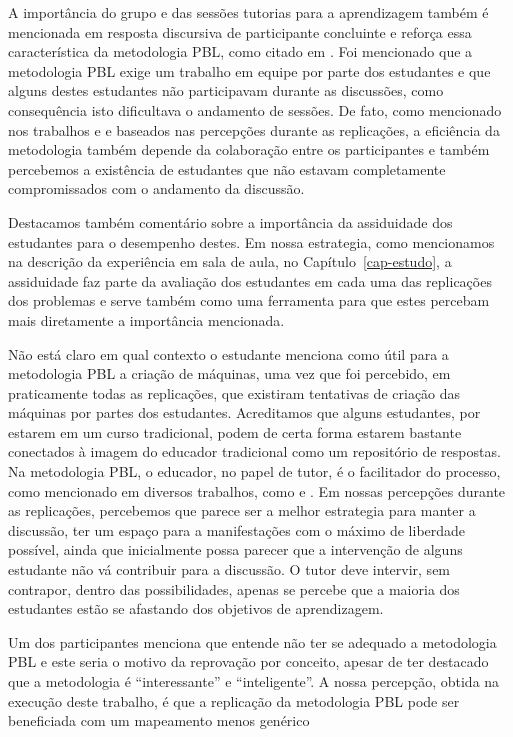 A importância do grupo e das sessões tutorias para a aprendizagem
também é mencionada em resposta discursiva de participante concluinte
e reforça essa característica da metodologia \ac{PBL}, como citado
em \cite{van2000motivation}.
Foi mencionado que a metodologia \ac{PBL} exige um trabalho em equipe por
parte dos estudantes e que alguns destes estudantes não participavam
durante as discussões, como consequência isto dificultava o
andamento de sessões.
De fato, como mencionado nos
trabalhos \cite{savery2015overview} e \cite{albanese2010problem}
e baseados nas percepções durante as replicações, a eficiência da metodologia
também depende da colaboração entre os participantes e
também percebemos a existência de estudantes que não estavam
completamente compromissados com o andamento da discussão.

Destacamos também comentário sobre a importância da assiduidade dos
estudantes para o desempenho destes.
Em nossa estrategia, como mencionamos na descrição da experiência
em sala de aula, no Capítulo~\ref{cap-estudo}, a assiduidade faz
parte da avaliação dos estudantes em cada uma das replicações dos
problemas e serve também como uma ferramenta para que estes
percebam mais diretamente a importância mencionada.

Não está claro em qual contexto o estudante menciona como útil
para a metodologia \ac{PBL} a criação de máquinas, uma vez que
foi percebido, em praticamente todas as replicações, que
existiram tentativas de criação das máquinas por partes
dos estudantes.
Acreditamos que alguns estudantes, por estarem em um curso
tradicional, podem de certa forma estarem bastante conectados
à imagem do educador tradicional como um repositório de
respostas.
Na metodologia \ac{PBL}, o educador, no papel de tutor, é o facilitador
do processo, como mencionado em diversos trabalhos, como
\cite{hmelo2004problem} e \cite{savery2015overview}.
Em nossas percepções durante as replicações, percebemos que
parece ser a melhor estrategia para manter a discussão, ter um
espaço para a manifestações com o máximo de liberdade possível,
ainda que inicialmente possa parecer que a intervenção
de alguns estudante não vá contribuir para
a discussão.
O tutor deve intervir, sem contrapor, dentro das possibilidades,
apenas se percebe que a maioria dos estudantes estão se afastando
dos objetivos de aprendizagem.

Um dos participantes menciona que entende não ter se adequado
a metodologia \ac{PBL} e este seria o motivo da reprovação por conceito,
apesar de ter destacado que a metodologia é ``interessante'' e ``inteligente''.
A nossa percepção, obtida na execução deste trabalho, é que a replicação
da metodologia \ac{PBL} pode ser beneficiada com um mapeamento menos genérico

